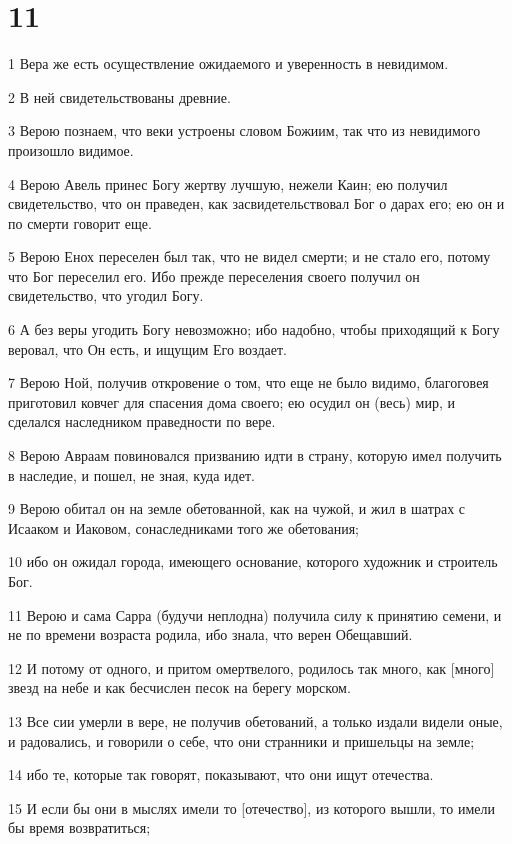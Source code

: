 \chapter{11}

\par 1 Вера же есть осуществление ожидаемого и уверенность в невидимом.
\par 2 В ней свидетельствованы древние.
\par 3 Верою познаем, что веки устроены словом Божиим, так что из невидимого произошло видимое.
\par 4 Верою Авель принес Богу жертву лучшую, нежели Каин; ею получил свидетельство, что он праведен, как засвидетельствовал Бог о дарах его; ею он и по смерти говорит еще.
\par 5 Верою Енох переселен был так, что не видел смерти; и не стало его, потому что Бог переселил его. Ибо прежде переселения своего получил он свидетельство, что угодил Богу.
\par 6 А без веры угодить Богу невозможно; ибо надобно, чтобы приходящий к Богу веровал, что Он есть, и ищущим Его воздает.
\par 7 Верою Ной, получив откровение о том, что еще не было видимо, благоговея приготовил ковчег для спасения дома своего; ею осудил он (весь) мир, и сделался наследником праведности по вере.
\par 8 Верою Авраам повиновался призванию идти в страну, которую имел получить в наследие, и пошел, не зная, куда идет.
\par 9 Верою обитал он на земле обетованной, как на чужой, и жил в шатрах с Исааком и Иаковом, сонаследниками того же обетования;
\par 10 ибо он ожидал города, имеющего основание, которого художник и строитель Бог.
\par 11 Верою и сама Сарра (будучи неплодна) получила силу к принятию семени, и не по времени возраста родила, ибо знала, что верен Обещавший.
\par 12 И потому от одного, и притом омертвелого, родилось так много, как [много] звезд на небе и как бесчислен песок на берегу морском.
\par 13 Все сии умерли в вере, не получив обетований, а только издали видели оные, и радовались, и говорили о себе, что они странники и пришельцы на земле;
\par 14 ибо те, которые так говорят, показывают, что они ищут отечества.
\par 15 И если бы они в мыслях имели то [отечество], из которого вышли, то имели бы время возвратиться;
